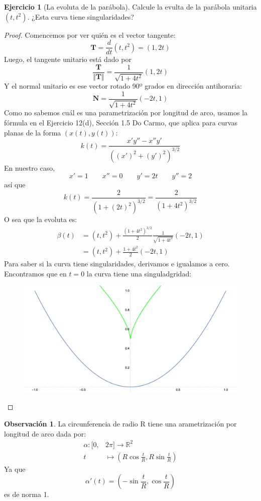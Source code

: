 \documentclass[spanish]{book}
\theoremstyle{definition}
\newtheorem*{obs}{Observación}
\newtheorem*{ejer}{Ejercicio}
\newcommand{\R}{\mathbb{R}}
\begin{document}
\begin{ejer}[La evoluta de la parábola] Calcule la evulta de la parábola unitaria $(t,t^2)$. ¿Esta curva tiene singularidades?
\end{ejer}
\begin{proof}
	Comencemos por ver quién es el vector tangente:
	\[\mathbf{T}=\frac{d}{dt}(t,t^2)=(1,2t)\]
	Luego, el tangente unitario está dado por
	\[\frac{\mathbf{T}}{\Vert \mathbf{T}\Vert}=\frac{1}{\sqrt{1+4t^2}}(1,2t)\]
	Y el normal unitario es ese vector rotado 90º grados en dirección antihoraria:
	\[\mathbf{N}=\frac{1}{\sqrt{1+4t^2}}(-2t,1)\]
	Como no sabemos cuál es una parametrización por longitud de arco, usamos la fórmula en el Ejercicio 12(d), Sección 1.5 Do Carmo, que aplica para curvas planas de la forma $(x(t),y(t))$:
	\[k(t)=\frac{x'y''-x''y'}{\left((x')^2+(y')^2\right)^{3/2}}\]
	En nuestro caso,
	\[x'=1\qquad x''=0\qquad y'=2t\qquad y''=2\]
	así que
	\[k(t)=\frac{2}{(1+(2t)^2)^{3/2}}=\frac{2}{(1+4t^2)^{3/2}}\]
	O sea que la evoluta es:
	\begin{align*}
		\beta(t)&=(t,t^2)+\frac{(1+4t^2)^{3/2}}{2}\frac{1}{\sqrt{1+4t^2}}(-2t,1)\\
		&=(t,t^2)+\frac{1+4t^2}{2}(-2t,1)
	\end{align*}
	Para saber si la curva tiene singularidades, derivamos e igualamos a cero. Encontramos que en $t=0$ la curva tiene una singuladgridad:
	\begin{figure}[H]
		\centering
		\includegraphics[width=0.7\linewidth]{curvas3}
	\end{figure}
\end{proof}
\begin{obs}
	La circunferencia de radio R tiene una arametrización por longitud de arco dada por:
	\begin{align*}
		\alpha:[0,&2\pi]\to \R^2\\
		t&\mapsto (R\cos{\frac{t}{R},R\sin{\frac{t}{R}}})
	\end{align*}
	Ya que 
	\[\alpha'(t)=(-\sin{\frac{t}{R}},\cos{\frac{t}{R}})\]
	es de norma 1.
\end{obs}
\end{document}
